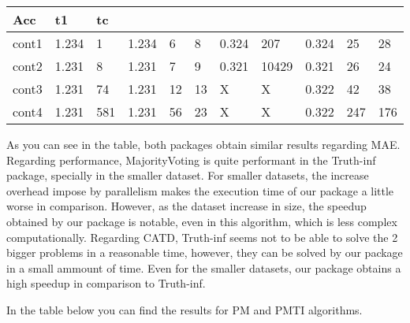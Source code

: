\documentclass[letterpaper,10pt,english]{sphinxmanual}
\begin{document}
\begin{savenotes}
\begin{tabulary}{\linewidth}[t]{|T|T|T|T|T|T|T|T|T|T|T|}
Acc
&\sphinxstyletheadfamily 
t1
&\sphinxstyletheadfamily 
tc
\\
\hline
cont1
&
1.234
&
1
&
1.234
&
6
&
8
&
0.324
&
207
&
0.324
&
25
&
28
\\
\hline
cont2
&
1.231
&
8
&
1.231
&
7
&
9
&
0.321
&
10429
&
0.321
&
26
&
24
\\
\hline
cont3
&
1.231
&
74
&
1.231
&
12
&
13
&
X
&
X
&
0.322
&
42
&
38
\\
\hline
cont4
&
1.231
&
581
&
1.231
&
56
&
23
&
X
&
X
&
0.322
&
247
&
176
\\
\hline
\end{tabulary}
\par
\sphinxattableend\end{savenotes}

As you can see in the table, both packages obtain similar results regarding MAE. Regarding performance,
MajorityVoting is quite performant in the Truth-inf package, specially in the smaller dataset. For smaller datasets,
the increase overhead impose by parallelism makes the execution time of our package a little worse in comparison.
However, as the dataset increase in size, the speedup obtained by our package is notable, even in this algorithm,
which is less complex computationally. Regarding CATD, Truth-inf seems not to be able to solve the 2 bigger problems
in a reasonable time, however, they can be solved by our package in a small ammount of time. Even for the smaller
datasets, our package obtains a high speedup in comparison to Truth-inf.

In the table below you can find the results for PM and PMTI algorithms.
\end{document}
